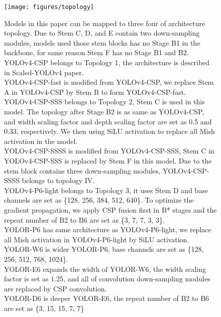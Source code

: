 \documentclass[10pt,twocolumn,letterpaper]{article}
\begin{document}
\begin{figure}[h]
\begin{center}
	\texttt{[image: figures/topology]}
\end{center}
\caption{Models in this paper can be mapped to three four of architecture topology. Due to Stem C, D, and E contain two down-sampling modules, models used those stem blocks has no Stage B1 in the backbone, for same reason Stem F has no Stage B1 and B2. \\  YOLOv4-CSP belongs to Topology 1, the architecture is described in Scaled-YOLOv4 paper. \\  YOLOv4-CSP-fast is modified from YOLOv4-CSP, we replace Stem A in YOLOv4-CSP by Stem B to form YOLOv4-CSP-fast. \\  YOLOv4-CSP-SSS belongs to Topology 2, Stem C is used in this model. The topology after Stage B2 is as same as YOLOv4-CSP, and width scaling factor and depth scaling factor are set as 0.5 and 0.33, respectively. We then using SiLU activation to replace all Mish activation in the model. \\  YOLOv4-CSP-SSSS is modified from YOLOv4-CSP-SSS, Stem C in YOLOv4-CSP-SSS is replaced by Stem F in this model. Due to the stem block contains three down-sampling modules, YOLOv4-CSP-SSSS belongs to topology IV. \\  YOLOv4-P6-light belongs to Topology 3, it uses Stem D and base channels are set as \{128, 256, 384, 512, 640\}. To optimize the gradient propagation, we apply CSP fusion first in B* stages and the repeat number of B2 to B6 are set as \{3, 7, 7, 3, 3\}. \\  YOLOR-P6 has same architecture as YOLOv4-P6-light, we replace all Mish activation in YOLOv4-P6-light by SiLU activation. \\  YOLOR-W6 is wider YOLOR-P6, base channels are set as \{128, 256, 512, 768, 1024\}. \\  YOLOR-E6 expands the width of YOLOR-W6, the width scaling factor is set as 1.25, and all of convolution down-sampling modules are replaced by CSP convolution. \\  YOLOR-D6 is deeper YOLOR-E6, the repeat number of B2 to B6 are set as \{3, 15, 15, 7, 7\}}
\label{fig:topo}
\end{figure}
\end{document}
